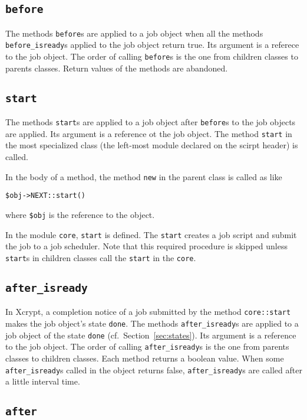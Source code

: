 \documentclass[a4paper,10pt]{report}
\def\|{\verb|} %|
\begin{document}
\subsection{\texttt{before}}

The methods \texttt{before}s are applied to a job object when all the
methods \texttt{before\_isready}s applied to the job object return
true.  Its argument is a referece to the job object.  The order of calling
\texttt{before}s is the one from children classes to parents
classes.  Return values of the methods are abandoned.

\subsection{\texttt{start}}

The methods \texttt{start}s are applied to a job object after
\texttt{before}s to the job objects are applied.  Its argument is a
reference ot the job object.  The method \|start| in the most
specialized class (the left-most module declared on the scirpt header)
is called.

In the body of a method, the method \|new| in the parent class is
called as like
\begin{center}
 \|$obj->NEXT::start()|
\end{center}
where \|$obj| is the reference to the object.

In the module \|core|, \|start| is defined.  The \|start| creates a
job script and submit the job to a job scheduler.  Note that this
required procedure is skipped unless \|start|s in children classes call
the \|start| in the \|core|.

\subsection{\texttt{after\_isready}}

In Xcrypt, a completion notice of a job submitted by the method
 \|core::start| makes the job object's state \|done|.  The methods
 \texttt{after\_isready}s are applied to a job object of the state
 \|done| (cf.\ Section~\ref{sec:states}).  Its argument is a reference
 to the job object.  The order of calling \texttt{after\_isready}s is
 the one from parents classes to children classes.  Each method
 returns a boolean value.  When some \texttt{after\_isready}s called
 in the object returns false, \texttt{after\_isready}s are called
 after a little interval time.

\subsection{\texttt{after}}
\end{document}
